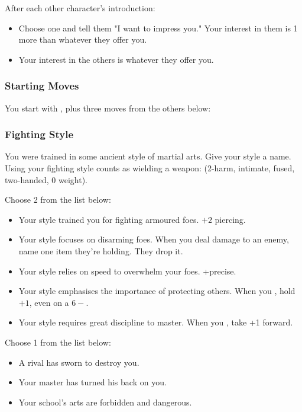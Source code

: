After each other character's introduction:
\begin{itemize}
\item Choose one and tell them "I want to impress you." Your interest in them is 1 more than whatever they offer you.
\item Your interest in the others is whatever they offer you.
\end{itemize}

\subsubsection{Starting Moves}
You start with , plus three moves from the others below:


\subsubsection{Fighting Style}
You were trained in some ancient style of martial arts. Give your style a name.
Using your fighting style counts as wielding a weapon: (2-harm, intimate, fused, two-handed, 0 weight).

Choose 2 from the list below:
\begin{itemize}
\item Your style trained you for fighting armoured foes. $+2$ piercing.
\item Your style focuses on disarming foes. When you deal damage to an enemy, name one item they're holding. They drop it.
\item Your style relies on speed to overwhelm your foes. +precise.
\item Your style emphasises the importance of protecting others. When you , hold $+1$, even on a $6-$.
\item Your style requires great discipline to master. When you , take +1 forward.
\end{itemize}

Choose 1 from the list below:
\begin{itemize}
\item A rival has sworn to destroy you.
\item Your master has turned his back on you.
\item Your school's arts are forbidden and dangerous.
\end{itemize}

